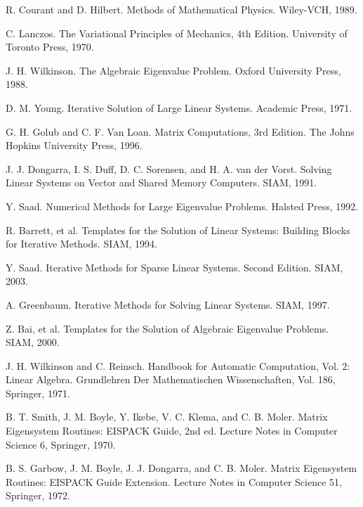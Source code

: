 \documentclass[a4paper]{jarticle}
\begin{document}
{\begin{thebibliography}{10}
R. Courant and D. Hilbert.
\newblock Methods of Mathematical Physics. 
\newblock Wiley-VCH, 1989.

C. Lanczos. 
\newblock The Variational Principles of Mechanics, 4th Edition. 
\newblock University of Toronto Press, 1970.

J. H. Wilkinson. 
\newblock The Algebraic Eigenvalue Problem. 
\newblock Oxford University Press, 1988.

D. M. Young. 
\newblock Iterative Solution of Large Linear Systems. 
\newblock Academic Press, 1971.

G. H. Golub and C. F. Van Loan.
\newblock Matrix Computations, 3rd Edition.
\newblock The Johns Hopkins University Press, 1996.

J. J. Dongarra, I. S. Duff, D. C. Sorensen, and H. A. van der Vorst.
\newblock Solving Linear Systems on Vector and Shared Memory Computers.
\newblock SIAM, 1991.

Y. Saad.
\newblock Numerical Methods for Large Eigenvalue Problems. 
\newblock Halsted Press, 1992.

R. Barrett, et al.
\newblock Templates for the Solution of Linear Systems: Building Blocks for Iterative Methods.
\newblock SIAM, 1994.

Y. Saad.
\newblock Iterative Methods for Sparse Linear Systems. Second Edition. 
\newblock SIAM, 2003.

A. Greenbaum.
\newblock Iterative Methods for Solving Linear Systems.
\newblock SIAM, 1997.

Z. Bai, et al.
\newblock Templates for the Solution of Algebraic Eigenvalue Problems. 
\newblock SIAM, 2000.

J. H. Wilkinson and C. Reinsch.
\newblock Handbook for Automatic Computation, Vol. 2: Linear Algebra.
\newblock Grundlehren Der Mathematischen Wissenschaften, Vol. 186, Springer, 1971.

B. T. Smith, J. M. Boyle, Y. Ikebe, V. C. Klema, and C. B. Moler.
\newblock Matrix Eigensystem Routines: EISPACK Guide, 2nd ed.
\newblock Lecture Notes in Computer Science 6, Springer, 1970.

B. S. Garbow, J. M. Boyle, J. J. Dongarra, and C. B. Moler.
\newblock Matrix Eigensystem Routines: EISPACK Guide Extension.
\newblock Lecture Notes in Computer Science 51, Springer, 1972.


\end{thebibliography}}
\end{document}
